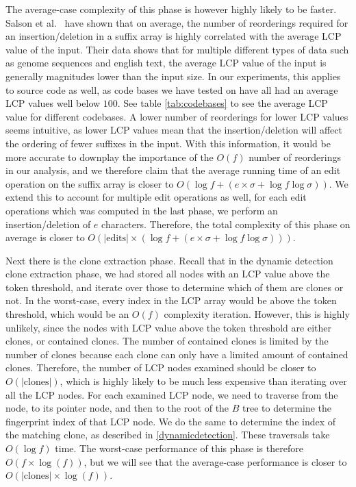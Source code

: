 The average-case complexity of this phase is however highly likely to be faster. Salson et
al.~\cite{DynamicExtendedSuffixArraysReorderings} have shown that on average, the number
of reorderings required for an insertion/deletion in a suffix array is highly correlated
with the average LCP value of the input. Their data shows that for multiple different
types of data such as genome sequences and english text, the average LCP value of the
input is generally magnitudes lower than the input size. In our experiments, this applies
to source code as well, as code bases we have tested on have all had an average LCP values
well below $100$. See table \ref{tab:codebases} to see the average LCP value for different
codebases. A lower number of reorderings for lower LCP values seems intuitive, as
lower LCP values mean that the insertion/deletion will affect the ordering of fewer
suffixes in the input. With this information, it would be more accurate to downplay the
importance of the $O(f)$ number of reorderings in our analysis, and we therefore claim
that the average running time of an edit operation on the suffix array is closer to $O(\log f +
(e \times \sigma + \log f \log\sigma))$. We extend this to account for multiple edit operations as
well, for each edit operations which was computed in the last phase, we perform an
insertion/deletion of $e$ characters. Therefore, the total complexity of this phase on
average is closer to $O(\vert\text{edits}\vert \times (\log f + (e \times \sigma + \log f
\log\sigma)))$.

Next there is the clone extraction phase. Recall that in the dynamic detection clone
extraction phase, we had stored all nodes with an LCP value above the token threshold, and
iterate over those to determine which of them are clones or not. In the worst-case, every
index in the LCP array would be above the token threshold, which would be an $O(f)$
complexity iteration. However, this is highly unlikely, since the nodes with LCP value
above the token threshold are either clones, or contained clones. The number of contained
clones is limited by the number of clones because each clone can only have a limited
amount of contained clones. Therefore, the number of LCP nodes examined should be closer
to $O(\vert\text{clones}\vert)$, which is highly likely to be much less expensive than
iterating over all the LCP nodes. For each examined LCP node, we need to traverse from the
node, to its pointer node, and then to the root of the $B$ tree to determine the
fingerprint index of that LCP node. We do the same to determine the index of the matching
clone, as described in \cref{dynamicdetection}. These traversals take $O(\log f)$ time.
The worst-case performance of this phase is therefore $O(f \times \log(f))$, but we will
see that the average-case performance is closer to $O(\vert\text{clones}\vert \times
\log(f))$.

